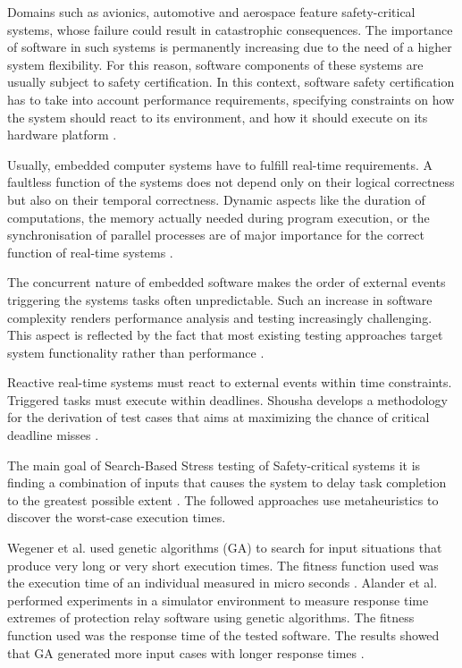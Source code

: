 \documentclass{bmcart}
\begin{document}
Domains such as avionics, automotive and aerospace feature safety-critical systems, whose failure could result in catastrophic consequences.  The importance
of software in such systems is permanently increasing due to the need of a higher system
flexibility. For this reason, software components of these systems are usually subject to safety certification. In this context, software safety certification has to take into account performance requirements, specifying constraints on how the system should react to its environment, and how it should execute on its hardware platform \citep{DiAlesio2013}.

Usually, embedded computer systems have to fulfill real-time requirements. A faultless function of the systems does not depend only on their logical correctness but also on their temporal correctness. Dynamic aspects like the duration of computations, the memory actually needed during program execution, or the synchronisation of parallel processes are of major importance for the correct function of real-time systems  \citep{J.WegenerK.GrimmM.GrochtmannH.Sthamer1996} .

The concurrent nature of embedded software makes  the order of external events triggering the systems tasks often unpredictable. Such an increase in software complexity
renders performance analysis and testing increasingly
challenging. This aspect is reflected by the fact that most existing testing approaches target system functionality rather than performance \citep{DiAlesio2013}.

Reactive real-time systems must react to external events within time constraints. Triggered tasks must execute within deadlines. Shousha develops a methodology for the derivation of test cases that aims at maximizing the chance of critical deadline misses \citep{shousha2003performance}. 

The main goal of Search-Based Stress testing of Safety-critical systems it is finding a combination of inputs that causes the system to delay task completion to the greatest possible extent \citep{shousha2003performance}. The followed approaches use metaheuristics to discover the worst-case execution times. 

Wegener et al. \citep{Wegener1997} used genetic algorithms (GA) to search for input situations that produce very long or very short execution times. The fitness function used was the execution time of an individual measured in micro seconds \citep{Wegener1997}. Alander et al. \citep{Alander} performed experiments in a simulator environment to measure response time extremes of protection relay software using genetic algorithms. The fitness function used was the response time of the tested software. The results showed that GA generated more input cases with longer response times \citep{Alander}. 
\end{document}
